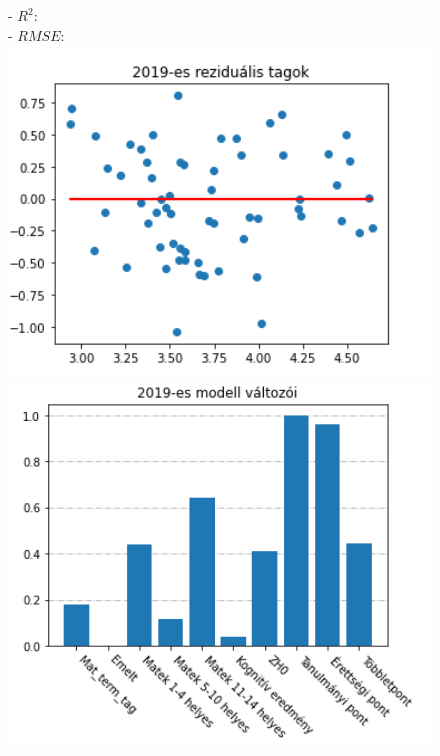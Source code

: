 \documentclass[12pt]{article}
\begin{document}
\begin{figure}[H]
    \centering
    \begin{minipage}[b]{0.4\textwidth}
    \raggedright
    - $R^2$: \\
    - $RMSE$: \\
    	\centering
        \includegraphics[width=1\textwidth, left]{kepek/residual2019.png} %
        \includegraphics[width=1\textwidth, left]{kepek/kumulalt2019.png} %
    \end{minipage}
    \begin{minipage}[b]{0.4\textwidth}

\end{minipage}
\end{figure}
\end{document}

